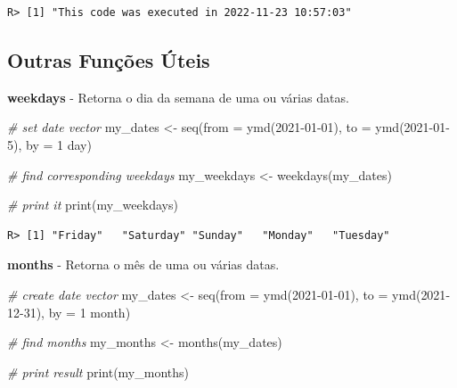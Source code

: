 \documentclass[
  11pt,
]{book}
\newenvironment{Shaded}{\begin{snugshade}}{\end{snugshade}}
\newcommand{\AttributeTok}[1]{\textcolor[rgb]{0.61,0.61,0.61}{#1}}
\newcommand{\CommentTok}[1]{\textcolor[rgb]{0.37,0.37,0.37}{\textit{#1}}}
\newcommand{\FunctionTok}[1]{\textcolor[rgb]{0,0,0}{#1}}
\newcommand{\NormalTok}[1]{#1}
\newcommand{\OtherTok}[1]{\textcolor[rgb]{0.37,0.37,0.37}{#1}}
\newcommand{\StringTok}[1]{\textcolor[rgb]{0.5,0.5,0.5}{#1}}
\begin{document}
\begin{verbatim}
R> [1] "This code was executed in 2022-11-23 10:57:03"
\end{verbatim}

\hypertarget{outras-funuxe7uxf5es-uxfateis-5}{%
\subsection{Outras Funções Úteis}\label{outras-funuxe7uxf5es-uxfateis-5}}

\textbf{weekdays} - Retorna o dia da semana de uma ou várias datas.

\begin{Shaded}
\begin{Highlighting}[]
\CommentTok{\# set date vector}
\NormalTok{my\_dates }\OtherTok{\textless{}{-}} \FunctionTok{seq}\NormalTok{(}\AttributeTok{from =} \FunctionTok{ymd}\NormalTok{(}\StringTok{\textquotesingle{}2021{-}01{-}01\textquotesingle{}}\NormalTok{),}
                \AttributeTok{to =} \FunctionTok{ymd}\NormalTok{(}\StringTok{\textquotesingle{}2021{-}01{-}5\textquotesingle{}}\NormalTok{),}
                \AttributeTok{by =} \StringTok{\textquotesingle{}1 day\textquotesingle{}}\NormalTok{)}

\CommentTok{\# find corresponding weekdays}
\NormalTok{my\_weekdays }\OtherTok{\textless{}{-}} \FunctionTok{weekdays}\NormalTok{(my\_dates)}

\CommentTok{\# print it}
\FunctionTok{print}\NormalTok{(my\_weekdays)}
\end{Highlighting}
\end{Shaded}

\begin{verbatim}
R> [1] "Friday"   "Saturday" "Sunday"   "Monday"   "Tuesday"
\end{verbatim}

\textbf{months} - Retorna o mês de uma ou várias datas.

\begin{Shaded}
\begin{Highlighting}[]
\CommentTok{\# create date vector}
\NormalTok{my\_dates }\OtherTok{\textless{}{-}} \FunctionTok{seq}\NormalTok{(}\AttributeTok{from =} \FunctionTok{ymd}\NormalTok{(}\StringTok{\textquotesingle{}2021{-}01{-}01\textquotesingle{}}\NormalTok{),}
                \AttributeTok{to =} \FunctionTok{ymd}\NormalTok{(}\StringTok{\textquotesingle{}2021{-}12{-}31\textquotesingle{}}\NormalTok{),}
                \AttributeTok{by =} \StringTok{\textquotesingle{}1 month\textquotesingle{}}\NormalTok{)}

\CommentTok{\# find months}
\NormalTok{my\_months }\OtherTok{\textless{}{-}} \FunctionTok{months}\NormalTok{(my\_dates)}

\CommentTok{\# print result}
\FunctionTok{print}\NormalTok{(my\_months)}
\end{Highlighting}
\end{Shaded}
\end{document}
